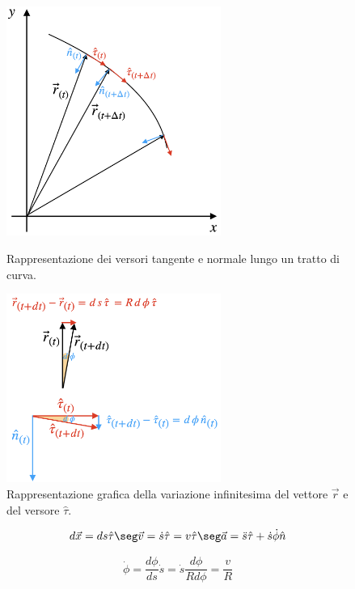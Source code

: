 \begin{figure}[htbp]
\begin{minipage}[b]{0.47\textwidth}
\centering
\includegraphics[width=7cm]{images/coordcurv.png}
\caption{Rappresentazione dei versori tangente e normale lungo un tratto di curva.}
\label{etichetta1}
\end{minipage}
\hfill
\begin{minipage}[b]{0.47\textwidth}
\centering
\includegraphics[width=7cm]{images/drdtau.png}
\caption{Rappresentazione grafica della variazione infinitesima del vettore $\vec r$ e del versore $\hat\tau$.}
\label{etichetta2}
\end{minipage}
\hfill
\end{figure}

\newpage


\begin{equation}
d\vec x = ds\hat\tau\seg \vec v = \dot s \hat\tau = v\hat\tau\seg \vec a = \ddot s\hat\tau + \dot s\dot\phi\hat n
\end{equation}

\begin{equation}
\dot\phi = \frac{d\phi}{ds}\dot s = \dot s \frac{d\phi}{Rd\phi} = \frac{v}{R}
\end{equation}

